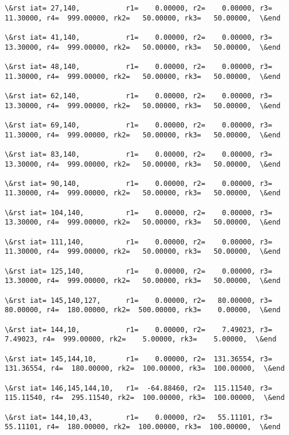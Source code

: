 \documentclass[11pt]{article}
\begin{document}
\begin{Verbatim}[commandchars=\\\{\}]
\&rst iat= 27,140,           r1=    0.00000, r2=    0.00000, r3=   11.30000, r4=  999.00000, rk2=   50.00000, rk3=   50.00000,  \&end

\&rst iat= 41,140,           r1=    0.00000, r2=    0.00000, r3=   13.30000, r4=  999.00000, rk2=   50.00000, rk3=   50.00000,  \&end

\&rst iat= 48,140,           r1=    0.00000, r2=    0.00000, r3=   11.30000, r4=  999.00000, rk2=   50.00000, rk3=   50.00000,  \&end

\&rst iat= 62,140,           r1=    0.00000, r2=    0.00000, r3=   13.30000, r4=  999.00000, rk2=   50.00000, rk3=   50.00000,  \&end

\&rst iat= 69,140,           r1=    0.00000, r2=    0.00000, r3=   11.30000, r4=  999.00000, rk2=   50.00000, rk3=   50.00000,  \&end

\&rst iat= 83,140,           r1=    0.00000, r2=    0.00000, r3=   13.30000, r4=  999.00000, rk2=   50.00000, rk3=   50.00000,  \&end

\&rst iat= 90,140,           r1=    0.00000, r2=    0.00000, r3=   11.30000, r4=  999.00000, rk2=   50.00000, rk3=   50.00000,  \&end

\&rst iat= 104,140,          r1=    0.00000, r2=    0.00000, r3=   13.30000, r4=  999.00000, rk2=   50.00000, rk3=   50.00000,  \&end

\&rst iat= 111,140,          r1=    0.00000, r2=    0.00000, r3=   11.30000, r4=  999.00000, rk2=   50.00000, rk3=   50.00000,  \&end

\&rst iat= 125,140,          r1=    0.00000, r2=    0.00000, r3=   13.30000, r4=  999.00000, rk2=   50.00000, rk3=   50.00000,  \&end

\&rst iat= 145,140,127,      r1=    0.00000, r2=   80.00000, r3=   80.00000, r4=  180.00000, rk2=  500.00000, rk3=    0.00000,  \&end

\&rst iat= 144,10,           r1=    0.00000, r2=    7.49023, r3=    7.49023, r4=  999.00000, rk2=    5.00000, rk3=    5.00000,  \&end

\&rst iat= 145,144,10,       r1=    0.00000, r2=  131.36554, r3=  131.36554, r4=  180.00000, rk2=  100.00000, rk3=  100.00000,  \&end

\&rst iat= 146,145,144,10,   r1=  -64.88460, r2=  115.11540, r3=  115.11540, r4=  295.11540, rk2=  100.00000, rk3=  100.00000,  \&end

\&rst iat= 144,10,43,        r1=    0.00000, r2=   55.11101, r3=   55.11101, r4=  180.00000, rk2=  100.00000, rk3=  100.00000,  \&end


\end{Verbatim}
\end{document}
